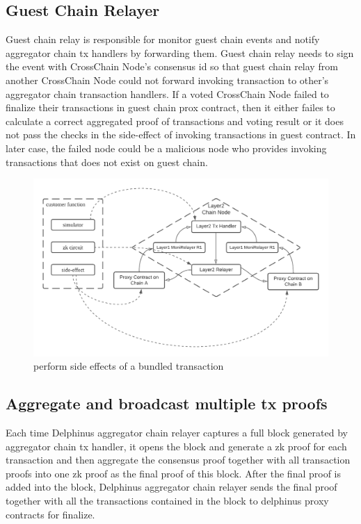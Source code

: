 \documentclass[acmtog, natbib=false]{acmart}
\begin{document}
\subsection{Guest Chain Relayer}
Guest chain relay is responsible for monitor guest chain events and notify aggregator chain tx handlers by forwarding them. Guest chain relay needs to sign the event with CrossChain Node's consensus id so that guest chain relay from another CrossChain Node could not forward invoking transaction to other's aggregator chain transaction handlers. If a voted CrossChain Node failed to finalize their transactions in guest chain prox contract, then it either failes to calculate a correct aggregated proof of transactions and voting result or it does not pass the checks in the side-effect of invoking transactions in guest contract. In later case, the failed node could be a malicious node who provides invoking transactions that does not exist on guest chain.  

\begin{figure}[!ht]
\caption{perform side effects of a bundled transaction}
\label{sideffects}
\includegraphics[scale=0.2]{side-effects}
\end{figure}


\subsection{Aggregate and broadcast multiple tx proofs}
Each time Delphinus aggregator chain relayer captures a full block generated by aggregator chain tx handler, it opens the block and generate a zk proof for each transaction and then aggregate the consensus proof together with all transaction proofs into one zk proof as the final proof of this block. After the final proof is added into the block, Delphinus aggregator chain relayer sends the final proof together with all the transactions contained in the block to delphinus proxy contracts for finalize.
\end{document}
